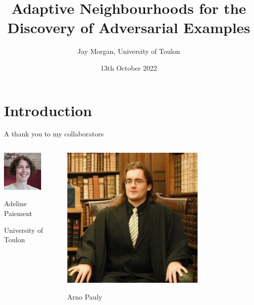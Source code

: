 \documentclass[smaller]{beamer}
\author{Jay Morgan, University of Toulon}
\date{13th October 2022}
\title{Adaptive Neighbourhoods for the Discovery of Adversarial Examples}
\begin{document}
\maketitle

\section{Introduction}
\label{sec:org5dd0e9b}

\begin{frame}[label={sec:orgb5bc604}]{A thank you to my collaborators}
\begin{columns}
\begin{column}{0.3\columnwidth}
\begin{center}
\includegraphics[width=0.7\textwidth]{images/Adeline-Paiement.jpg}
\end{center}
\begin{center}
Adeline Paiement

University of Toulon
\end{center}
\end{column}
\begin{column}{0.3\columnwidth}
\begin{center}
\includegraphics[width=0.7\textwidth]{images/Arno-Pauly.jpg}
\end{center}
\begin{center}
Arno Pauly


\end{center}
\end{column}
\end{columns}
\end{frame}
\end{document}
